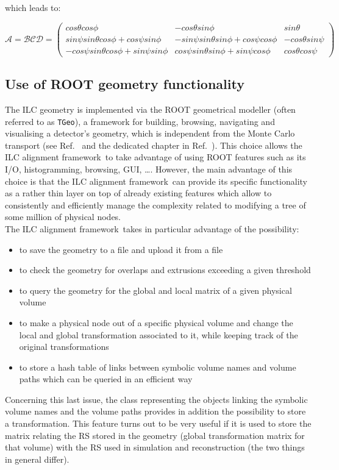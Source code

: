 \documentclass[12pt,a4paper,twoside]{article}
\makeatletter
\newcommand {\ROOT} {ROOT\@\xspace}
\newcommand{\FR}{ILC alignment framework}
\newcommand{\tgeo}{\lstinline!TGeo!}
\makeatother
\begin{document}
{which leads to:

$$ \mathcal{A}  =  \mathcal{B} \mathcal{C} \mathcal{D} =
      \left( \begin{array}{ccc}

           cos\theta cos\phi & -cos\theta sin\phi & sin\theta \\
           sin\psi sin\theta cos\phi + cos\psi sin\phi & -sin\psi
           sin\theta sin\phi+cos\psi cos\phi & -cos\theta sin\psi \\
           -cos\psi sin\theta cos\phi+sin\psi sin\phi & cos\psi
           sin\theta sin\phi + sin\psi cos\phi & cos\theta cos\psi

      \end{array} \right) $$

\subsection{Use of \ROOT geometry functionality}
\label{sec:ROOT}
The ILC geometry is implemented via the \ROOT geometrical modeller
(often referred to as \tgeo), a framework for building, browsing,
navigating and visualising a detector's geometry, which is independent
from the Monte Carlo transport (see Ref.~\cite{tgeo} and the dedicated
chapter in Ref.~\cite{rootUG}). This choice allows the \FR\ to take
advantage of using \ROOT features such as its I/O,
histogramming, browsing, GUI, \ldots.  However, the main advantage of
this choice is that the \FR\ can provide its specific functionality as
a rather thin layer on
top of already existing features which allow to consistently and
efficiently manage the complexity related to modifying a tree of some
million of physical nodes.\\ The \FR\ takes in particular advantage of
the possibility:
\begin{itemize}
  \item to save the geometry to a file and upload it from a file
  \item to check the geometry for overlaps and extrusions exceeding a
  given threshold
  \item to query the geometry for the global and local matrix of a given
  physical volume
  \item to make a physical node out of a specific physical volume and
  change the local and global transformation associated to it, while
  keeping track of the original transformations
  \item to store a hash table of links between symbolic volume
  names and volume paths which can be queried in an efficient way
\end{itemize}
Concerning this last issue, the class representing the objects linking
the symbolic volume names and the volume paths provides in addition
the possibility to store a transformation. This feature turns out to be very
useful if it is used to store the matrix relating the RS stored in the
geometry (global transformation matrix for that volume) with the RS
used in simulation and reconstruction (the two things in general differ).


}
\end{document}
